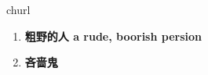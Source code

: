 
\begin{frame}
{\huge churl}
\begin{center}
\begin{enumerate}\Large
  \item \textbf{粗野的人 a rude, boorish persion}
  \item \textbf{吝啬鬼}
\end{enumerate}
\end{center}
\end{frame}
